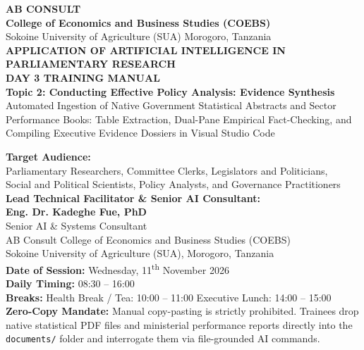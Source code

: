 \documentclass[11pt, a4paper]{report}
\begin{document}
\begin{titlepage}
    \centering
    \vspace*{0.5cm}
    
    {\LARGE \textbf{\textcolor{tanzaniablue}{AB CONSULT}}}\\[0.2cm]
    {\large \textbf{College of Economics and Business Studies (COEBS)}}\\[0.15cm]
    {\normalsize Sokoine University of Agriculture (SUA) \textbullet{} Morogoro, Tanzania}\\[1.2cm]
    
    {\LARGE \textbf{\textcolor{suagreen}{APPLICATION OF ARTIFICIAL INTELLIGENCE IN PARLIAMENTARY RESEARCH}}}\\[0.4cm]
    {\Huge \textbf{DAY 3 TRAINING MANUAL}}\\[0.4cm]
    {\Large \textbf{Topic 2: Conducting Effective Policy Analysis: Evidence Synthesis}}\\[0.25cm]
    {\large Automated Ingestion of Native Government Statistical Abstracts and Sector Performance Books: Table Extraction, Dual-Pane Empirical Fact-Checking, and Compiling Executive Evidence Dossiers in Visual Studio Code}\\[1.2cm]
    
    \begin{minipage}{0.92\textwidth}
        \centering
        \textbf{Target Audience:}\\
        Parliamentary Researchers, Committee Clerks, Legislators and Politicians,\\
        Social and Political Scientists, Policy Analysts, and Governance Practitioners\\[0.6cm]
        
        \textbf{Lead Technical Facilitator \& Senior AI Consultant:}\\
        \textbf{\Large Eng. Dr. Kadeghe Fue, PhD}\\
        Senior AI \& Systems Consultant\\
        AB Consult \textbullet{} College of Economics and Business Studies (COEBS)\\
        Sokoine University of Agriculture (SUA), Morogoro, Tanzania\\[0.6cm]
        
        \textbf{Date of Session:} Wednesday, 11\textsuperscript{th} November 2026\\
        \textbf{Daily Timing:} 08:30 -- 16:00\\
        \textbf{Breaks:} Health Break / Tea: 10:00 -- 11:00 \textbar{} Executive Lunch: 14:00 -- 15:00\\
        \textbf{Zero-Copy Mandate:} Manual copy-pasting is strictly prohibited. Trainees drop native statistical PDF files and ministerial performance reports directly into the \texttt{documents/} folder and interrogate them via file-grounded AI commands.
    \end{minipage}
    

\end{titlepage}
\end{document}
